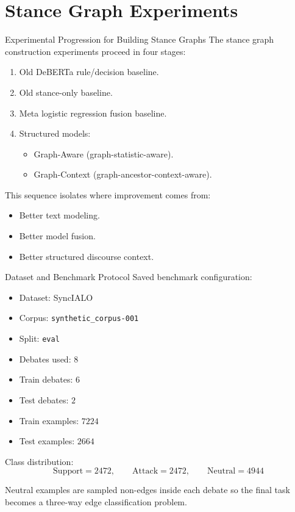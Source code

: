 \documentclass[aspectratio=169, 10pt]{beamer}
\begin{document}
\section{Stance Graph Experiments}

\begin{frame}{Experimental Progression for Building Stance Graphs}
The stance graph construction experiments proceed in four stages:
\begin{enumerate}
  \item Old DeBERTa rule/decision baseline.
  \item Old stance-only baseline.
  \item Meta logistic regression fusion baseline.
  \item Structured models:
  \begin{itemize}
    \item Graph-Aware (graph-statistic-aware).
    \item Graph-Context (graph-ancestor-context-aware).
  \end{itemize}
\end{enumerate}

This sequence isolates where improvement comes from:
\begin{itemize}
  \item Better text modeling.
  \item Better model fusion.
  \item Better structured discourse context.
\end{itemize}
\end{frame}

\begin{frame}{Dataset and Benchmark Protocol}
Saved benchmark configuration:
\begin{itemize}
  \item Dataset: SyncIALO
  \item Corpus: \texttt{synthetic\_corpus-001}
  \item Split: \texttt{eval}
  \item Debates used: \(8\)
  \item Train debates: \(6\)
  \item Test debates: \(2\)
  \item Train examples: \(7224\)
  \item Test examples: \(2664\)
\end{itemize}

Class distribution:
\[
\text{Support}=2472,\qquad \text{Attack}=2472,\qquad \text{Neutral}=4944
\]

Neutral examples are sampled non-edges inside each debate so the final task becomes a three-way edge classification problem.
\end{frame}
\end{document}
